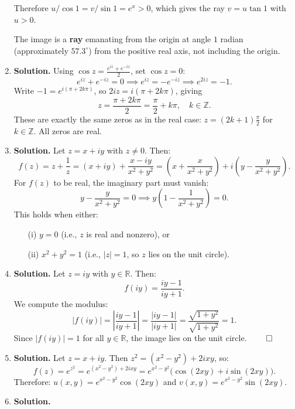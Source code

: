 \begin{enumerate}
Therefore $u/\cos 1 = v/\sin 1 = e^x > 0$, which gives the ray $v = u\tan 1$ with $u > 0$.

The image is a \textbf{ray} emanating from the origin at angle $1$ radian (approximately $57.3^\circ$) from the positive real axis, not including the origin.

\item \textbf{Solution.}
Using $\cos z = \frac{e^{iz} + e^{-iz}}{2}$, set $\cos z = 0$:
\[
e^{iz} + e^{-iz} = 0 \implies e^{iz} = -e^{-iz} \implies e^{2iz} = -1.
\]
Write $-1 = e^{i(\pi + 2k\pi)}$, so $2iz = i(\pi + 2k\pi)$, giving
\[
z = \frac{\pi + 2k\pi}{2} = \frac{\pi}{2} + k\pi, \quad k \in \mathbb{Z}.
\]
These are exactly the same zeros as in the real case: $z = (2k+1)\frac{\pi}{2}$ for $k \in \mathbb{Z}$. All zeros are real.

\item \textbf{Solution.}
Let $z = x + iy$ with $z \neq 0$. Then:
\[
f(z) = z + \frac{1}{z} = (x + iy) + \frac{x - iy}{x^2 + y^2} = \left(x + \frac{x}{x^2 + y^2}\right) + i\left(y - \frac{y}{x^2 + y^2}\right).
\]
For $f(z)$ to be real, the imaginary part must vanish:
\[
y - \frac{y}{x^2 + y^2} = 0 \implies y\left(1 - \frac{1}{x^2 + y^2}\right) = 0.
\]
This holds when either:
\begin{enumerate}
    \item[(i)] $y = 0$ (i.e., $z$ is real and nonzero), or
    \item[(ii)] $x^2 + y^2 = 1$ (i.e., $|z| = 1$, so $z$ lies on the unit circle).
\end{enumerate}

\item \textbf{Solution.}
Let $z = iy$ with $y \in \mathbb{R}$. Then:
\[
f(iy) = \frac{iy - 1}{iy + 1}.
\]
We compute the modulus:
\[
|f(iy)| = \left|\frac{iy - 1}{iy + 1}\right| = \frac{|iy - 1|}{|iy + 1|} = \frac{\sqrt{1 + y^2}}{\sqrt{1 + y^2}} = 1.
\]
Since $|f(iy)| = 1$ for all $y \in \mathbb{R}$, the image lies on the unit circle. $\qed$

\item \textbf{Solution.}
Let $z = x + iy$. Then $z^2 = (x^2 - y^2) + 2ixy$, so:
\[
f(z) = e^{z^2} = e^{(x^2 - y^2) + 2ixy} = e^{x^2 - y^2}\bigl(\cos(2xy) + i\sin(2xy)\bigr).
\]
Therefore: $u(x,y) = e^{x^2 - y^2}\cos(2xy)$ and $v(x,y) = e^{x^2 - y^2}\sin(2xy)$.

\item \textbf{Solution.}


\end{enumerate}
